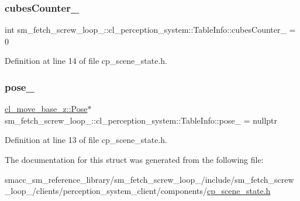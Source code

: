 \subsubsection{\texorpdfstring{cubes\+Counter\+\_\+}{cubesCounter\_}}
{\footnotesize\ttfamily int sm\+\_\+fetch\+\_\+screw\+\_\+loop\+\_\+::cl\+\_\+perception\+\_\+system\+::\+Table\+Info\+::cubes\+Counter\+\_\+ = 0}



Definition at line 14 of file cp\+\_\+scene\+\_\+state.\+h.

\mbox{\label{structsm__fetch__screw__loop__1_1_1cl__perception__system_1_1TableInfo_a09e74aceb68de28b3b8fa46d30a68f4a}} 
\subsubsection{\texorpdfstring{pose\+\_\+}{pose\_}}
{\footnotesize\ttfamily \hyperlink{classcl__move__base__z_1_1Pose}{cl\+\_\+move\+\_\+base\+\_\+z\+::\+Pose}$\ast$ sm\+\_\+fetch\+\_\+screw\+\_\+loop\+\_\+::cl\+\_\+perception\+\_\+system\+::\+Table\+Info\+::pose\+\_\+ = nullptr}



Definition at line 13 of file cp\+\_\+scene\+\_\+state.\+h.



The documentation for this struct was generated from the following file\+:\begin{DoxyCompactItemize}
\item 
smacc\+\_\+sm\+\_\+reference\+\_\+library/sm\+\_\+fetch\+\_\+screw\+\_\+loop\+\_/include/sm\+\_\+fetch\+\_\+screw\+\_\+loop\+\_/clients/perception\+\_\+system\+\_\+client/components/\hyperlink{sm__fetch__screw__loop__1_2include_2sm__fetch__screw__loop__1_2clients_2perception__system__clieee3458176781c2fc203d99687f5e5b43}{cp\+\_\+scene\+\_\+state.\+h}\end{DoxyCompactItemize}
